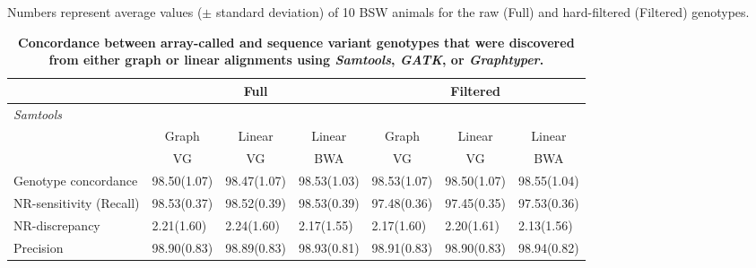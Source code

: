 \documentclass[../main.tex]{subfiles}
\begin{document}
\begin{flushleft}
\begin{landscape}
\begin{table}
    \centering
    \caption{\textbf{Concordance between array-called and sequence variant genotypes that were discovered from either graph or linear alignments using \emph{Samtools}, \emph{GATK}, or \emph{Graphtyper}.}} 
    \small{Numbers represent average values ($\pm$ standard deviation) of 10 BSW animals for the raw (Full) and hard-filtered (Filtered) genotypes.}
    \bigskip
    \label{sup_tab:s33}
    \begin{tabular}{|l|l|l|l|l|l|l|} 
    \hline
    ~                       & \multicolumn{3}{c|}{Full}                                                              & \multicolumn{3}{c|}{Filtered}                                                           \\ 
    \hline
    \multicolumn{7}{|l|}{\textit{Samtools}}                                                                                                                                                                    \\ 
    \hline
    \multirow{2}{*}{~}      & \multicolumn{1}{c|}{Graph} & \multicolumn{1}{c|}{Linear} & \multicolumn{1}{c|}{Linear} & \multicolumn{1}{c|}{Graph} & \multicolumn{1}{c|}{Linear} & \multicolumn{1}{c|}{Linear}  \\ 
    \cline{2-7}
                            & \multicolumn{1}{c|}{VG}    & \multicolumn{1}{c|}{VG}     & \multicolumn{1}{c|}{BWA}    & \multicolumn{1}{c|}{VG}    & \multicolumn{1}{c|}{VG}     & \multicolumn{1}{c|}{BWA}     \\ 
    \hline
    Genotype concordance    & 98.50(1.07)                & 98.47(1.07)                 & 98.53(1.03)                 & 98.53(1.07)                & 98.50(1.07)                 & 98.55(1.04)                  \\ 
    \hline
    NR-sensitivity (Recall) & 98.53(0.37)                & 98.52(0.39)                 & 98.53(0.39)                 & 97.48(0.36)                & 97.45(0.35)                 & 97.53(0.36)                  \\ 
    \hline
    NR-discrepancy          & 2.21(1.60)                 & 2.24(1.60)                  & 2.17(1.55)                  & 2.17(1.60)                 & 2.20(1.61)                  & 2.13(1.56)                   \\ 
    \hline
    Precision               & 98.90(0.83)                & 98.89(0.83)                 & 98.93(0.81)                 & 98.91(0.83)                & 98.90(0.83)                 & 98.94(0.82)                  \\ 

\end{tabular}
\end{table}
\end{landscape}
\end{flushleft}
\end{document}
